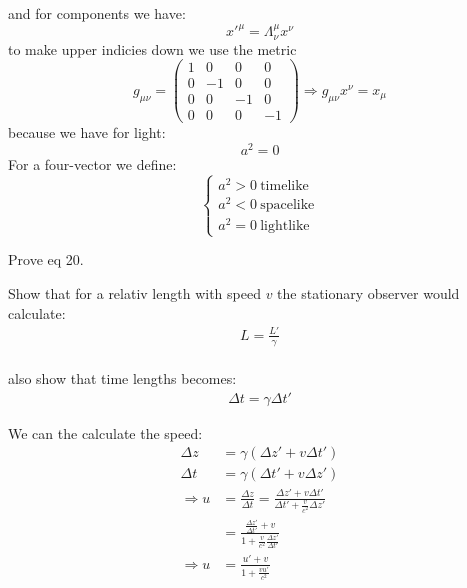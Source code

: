 \documentclass[10pt,a4paper]{article}
\begin{document}
          and for components we have:
          \begin{equation}
               x'^{\mu} = \Lambda^{\mu}_{\nu}x^{\nu}
          \end{equation}
          to make upper indicies down we use the metric
          \begin{equation}
               g_{\mu\nu} =\begin{pmatrix}
                    1&0&0&0\\
                    0&-1&0&0\\
                    0&0&-1&0\\
                    0&0&0&-1
               \end{pmatrix}
               \Rightarrow g_{\mu\nu} x^{\nu} = x_{\mu}
          \end{equation}
          because we have for light:
          \begin{equation}
               a^2 = 0
          \end{equation}
          For a four-vector we define:
          \begin{equation}
               \left\{\begin{matrix}
                    a^2 >0 \ \text{timelike}\\
                    a^2 <0 \ \text{spacelike}\\
                    a^2 =0 \ \text{lightlike}
               \end{matrix}\right.
          \end{equation}
          \begin{ecx}
               Prove eq 20.
          \end{ecx}
          \begin{ecx}
               Show that for a relativ length with speed $v$ the stationary observer would calculate:
               \begin{align*}
                    L = \frac{L'}{\gamma}
               \end{align*}
               \\
               also show that time lengths becomes:
               \begin{align*}
                    \Delta t = \gamma\Delta t'
               \end{align*}
          \end{ecx}
          We can the calculate the speed:
          \begin{align*}
               \Delta z &= \gamma (\Delta z' + v\Delta t')\\
               \Delta t &= \gamma (\Delta t' + v \Delta z')\\
               \Rightarrow  u &=\frac{\Delta z}{\Delta t} = \frac{\Delta z'+v\Delta t'}{\Delta t' + \frac{v}{c^2}\Delta z'}\\
               &= \frac{\frac{\Delta z'}{\Delta t'}+v}{1+\frac{v}{c^2}\frac{\Delta z'}{\Delta t'}}\\
               \Rightarrow u &= \frac{u' + v}{1+\frac{vu'}{c^2}}
          \end{align*}
\end{document}
